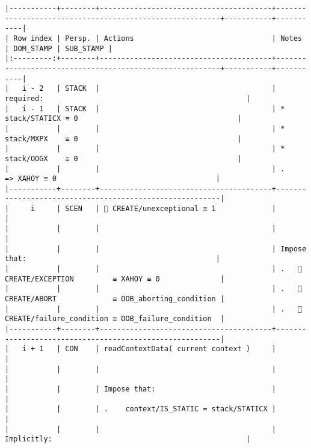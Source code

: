 \documentclass[varwidth=\maxdimen,margin=0.5cm,multi={verbatim}]{standalone}
\begin{document}
\begin{verbatim}
|-----------+--------+----------------------------------------+---------------------------------------------------------+-----------+-----------|
| Row index | Persp. | Actions                                | Notes                                                   | DOM_STAMP | SUB_STAMP |
|:---------:+--------+----------------------------------------+---------------------------------------------------------+-----------+-----------|
|   i - 2   | STACK  |                                        | required:                                               |
|   i - 1   | STACK  |                                        | * stack/STATICX ≡ 0                                     |
|           |        |                                        | * stack/MXPX    ≡ 0                                     |
|           |        |                                        | * stack/OOGX    ≡ 0                                     |
|           |        |                                        | .      => XAHOY ≡ 0                                     |
|-----------+--------+----------------------------------------+---------------------------------------------------------|
|     i     | SCEN   |  CREATE/unexceptional ≡ 1             |                                                         |
|           |        |                                        |                                                         |
|           |        |                                        | Impose that:                                            |
|           |        |                                        | .    CREATE/EXCEPTION         ≡ XAHOY ≡ 0              |
|           |        |                                        | .    CREATE/ABORT             ≡ OOB_aborting_condition |
|           |        |                                        | .    CREATE/failure_condition ≡ OOB_failure_condition  |
|-----------+--------+----------------------------------------+---------------------------------------------------------|
|   i + 1   | CON    | readContextData( current context )     |                                                         |
|           |        |                                        |                                                         |
|           |        | Impose that:                           |                                                         |
|           |        | .    context/IS_STATIC = stack/STATICX |                                                         |
|           |        |                                        | Implicitly:                                             |

\end{verbatim}
\end{document}
